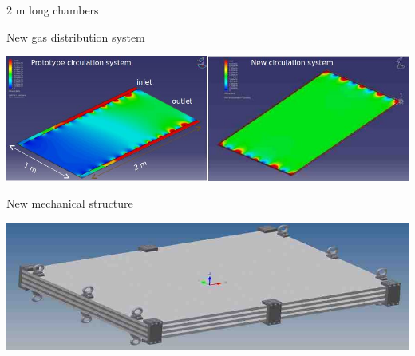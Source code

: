 \documentclass[10pt]{beamer}
\begin{document}
\begin{frame}{2 m long chambers}
\begin{block}{New gas distribution system}
  \centerline{\includegraphics[width=1.15\textwidth]{jpg/gasflow2m.jpg}}
\end{block}
\begin{block}{New mechanical structure}
  \centerline{\includegraphics[width=1.15\textwidth]{jpg/2mmechanic.jpg}}
\end{block}
\end{frame}
\end{document}

